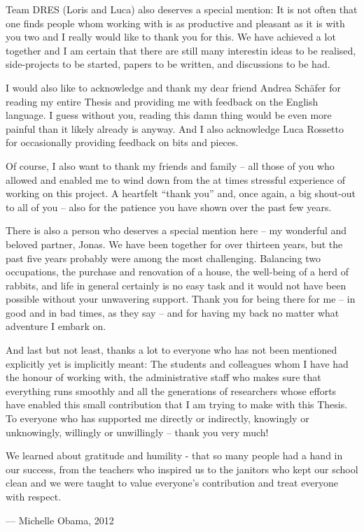 Team DRES (Loris and Luca) also deserves a special mention: It is not often that one finds people whom working with is as productive and pleasant as it is with you two and I really would like to thank you for this. We have achieved a lot together and I am certain that there are still many interestin ideas to be realised, side-projects to be started, papers to be written, and discussions to be had.

I would also like to acknowledge and thank my dear friend Andrea Schäfer for reading my entire Thesis and providing me with feedback on the English language. I guess without you, reading this damn thing would be even more painful than it likely already is anyway. And I also acknowledge Luca Rossetto for occasionally providing feedback on bits and pieces.

Of course, I also want to thank my friends and family -- all those of you who allowed and enabled me to wind down from the at times stressful experience of working on this project. A heartfelt ``thank you'' and, once again, a big shout-out to all of you -- also for the patience you have shown over the past few years.

There is also a person who deserves a special mention here -- my wonderful and beloved partner, Jonas. We have been together for over thirteen years, but the past five years probably were among the most challenging. Balancing two occupations, the purchase and renovation of a house, the well-being of a herd of rabbits, and life in general certainly is no easy task and it would not have been possible without your unwavering support. Thank you for being there for me -- in good and in bad times, as they say -- and for having my back no matter what adventure I embark on.

And last but not least, thanks a lot to everyone who has not been mentioned explicitly yet is implicitly meant: The students and colleagues whom I have had the honour of working with, the administrative staff who makes sure that everything runs smoothly and all the generations of researchers whose efforts have enabled this small contribution that I am trying to make with this Thesis. To everyone who has supported me directly or indirectly, knowingly or unknowingly, willingly or unwillingly -- thank you very much!

\epigraph{We learned about gratitude and humility - that so many people had a hand in our success, from the teachers who inspired us to the janitors who kept our school clean and we were taught to value everyone's contribution and treat everyone with respect.}{--- \textup{Michelle Obama}, 2012}


\cleardoublepage
